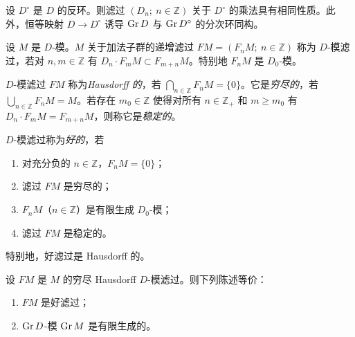 设 $D^\circ$ 是 $D$ 的反环。则滤过 $(D_n;\ n\in\mathbb{Z})$ 关于 $D^\circ$ 的乘法具有相同性质。此外，恒等映射 $D\longrightarrow D^\circ$ 诱导 $\operatorname{Gr} D$ 与 $\operatorname{Gr} D^\circ$ 的分次环同构。

设 $M$ 是 $D$-模。$M$ 关于加法子群的递增滤过 $F M=(F_n M;\ n\in\mathbb{Z})$ 称为 $D$-模滤过，若对 $n,m\in\mathbb{Z}$ 有 $D_n\cdot F_m M\subset F_{m+n}M$。特别地 $F_n M$ 是 $D_0$-模。

$D$-模滤过 $F M$ 称为\emph{Hausdorff 的}，若 $\bigcap_{n\in\mathbb{Z}}F_n M=\{0\}$。它是\emph{穷尽的}，若 $\bigcup_{n\in\mathbb{Z}}F_n M=M$。若存在 $m_0\in\mathbb{Z}$ 使得对所有 $n\in\mathbb{Z}_+$ 和 $m\ge m_0$ 有 $D_n\cdot F_m M=F_{m+n}M$，则称它是\emph{稳定的}。

$D$-模滤过称为\emph{好的}，若
\begin{enumerate}[label=(\roman*)]
  \item 对充分负的 $n\in\mathbb{Z}$，$F_n M=\{0\}$；
  \item 滤过 $F M$ 是穷尽的；
  \item $F_n M$（$n\in\mathbb{Z}$）是有限生成 $D_0$-模；
  \item 滤过 $F M$ 是稳定的。
\end{enumerate}
特别地，好滤过是 Hausdorff 的。

\begin{lemma}
设 $F M$ 是 $M$ 的穷尽 Hausdorff $D$-模滤过。则下列陈述等价：
\begin{enumerate}[label=(\roman*)]
  \item $F M$ 是好滤过；
  \item $\operatorname{Gr} D$-模 $\operatorname{Gr} M$ 是有限生成的。
\end{enumerate}
\end{lemma}

